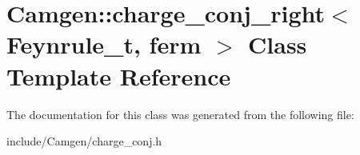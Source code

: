 \hypertarget{a00064}{}\section{Camgen\+:\+:charge\+\_\+conj\+\_\+right$<$ Feynrule\+\_\+t, ferm $>$ Class Template Reference}
\label{a00064}


The documentation for this class was generated from the following file\+:\begin{DoxyCompactItemize}
\item 
include/\+Camgen/charge\+\_\+conj.\+h\end{DoxyCompactItemize}
